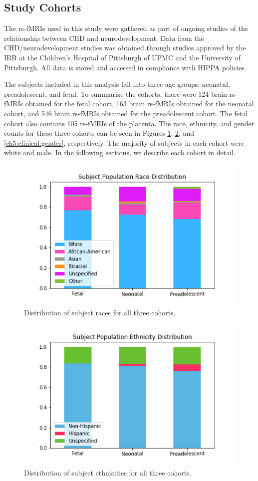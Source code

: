 \subsection{Study Cohorts}

The rs-fMRIs used in this study were gathered as part of ongoing studies of the relationship between CHD and neurodevelopment. Data from the CHD/neurodevelopment studies was obtained through studies approved by the IRB at the Children's Hospital of Pittsburgh of UPMC and the University of Pittsburgh. All data is stored and accessed in compliance with HIPPA policies.

The subjects included in this analysis fall into three age groups: neonatal, preadolescent, and fetal. To summarize the cohorts, there were 124 brain rs-fMRIs obtained for the fetal cohort, 163 brain rs-fMRIs obtained for the neonatal cohort, and 546 brain rs-fMRIs obtained for the preadolescent cohort. The fetal cohort also contains 105 rs-fMRIs of the placenta. The race, ethnicity, and gender counts for these three cohorts can be seen in Figures \ref{ch5:clinical:race}, \ref{ch5:clinical:eth}, and \ref{ch5:clinical:gender}, respectively. The majority of subjects in each cohort were white and male. In the following sections, we describe each cohort in detail. 

\begin{figure}
\centering
\includegraphics[width=.75\textwidth]{5/demo_clinical_subj_race.png}
\caption{Distribution of subject races for all three cohorts.}
\label{ch5:clinical:race}
\end{figure}%
%
\begin{figure}
\centering
\includegraphics[width=.75\textwidth]{5/demo_clinical_subj_ethnicity.png}
\caption{Distribution of subject ethnicities for all three cohorts.}
\label{ch5:clinical:eth}
\end{figure}

